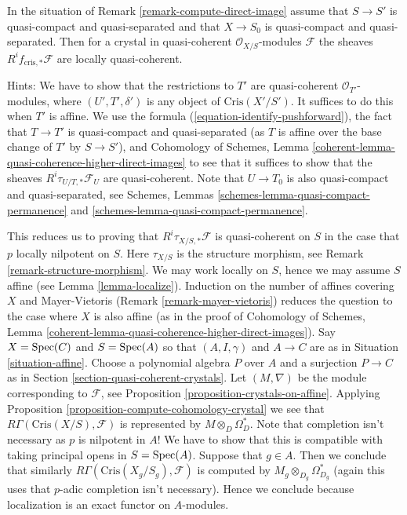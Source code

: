 \begin{remark}
\label{remark-quasi-coherent}
In the situation of Remark \ref{remark-compute-direct-image}
assume that $S \to S'$ is quasi-compact and quasi-separated and
that $X \to S_0$ is quasi-compact and quasi-separated. Then for a crystal
in quasi-coherent $\mathcal{O}_{X/S}$-modules $\mathcal{F}$
the sheaves $R^if_{\text{cris}, *}\mathcal{F}$ are locally quasi-coherent.

\medskip\noindent
Hints: We have to show that the restrictions to $T'$ are quasi-coherent
$\mathcal{O}_{T'}$-modules, where $(U', T', \delta')$ is any object of
$\text{Cris}(X'/S')$. It suffices to do this when $T'$ is affine.
We use the formula (\ref{equation-identify-pushforward}),
the fact that $T \to T'$ is quasi-compact and quasi-separated (as $T$
is affine over the base change of $T'$ by $S \to S'$), and
Cohomology of Schemes, Lemma
\ref{coherent-lemma-quasi-coherence-higher-direct-images}
to see that it suffices to show that the sheaves
$R^i\tau_{U/T, *}\mathcal{F}_U$ are quasi-coherent.
Note that $U \to T_0$ is also quasi-compact and quasi-separated, see
Schemes, Lemmas \ref{schemes-lemma-quasi-compact-permanence} and
\ref{schemes-lemma-quasi-compact-permanence}.

\medskip\noindent
This reduces us to proving that $R^i\tau_{X/S, *}\mathcal{F}$
is quasi-coherent on $S$ in the case that $p$ locally nilpotent on $S$. Here
$\tau_{X/S}$ is the structure morphism, see
Remark \ref{remark-structure-morphism}.
We may work locally on $S$, hence we may assume $S$ affine
(see Lemma \ref{lemma-localize}). Induction on the number
of affines covering $X$ and Mayer-Vietoris
(Remark \ref{remark-mayer-vietoris}) reduces the question to
the case where $X$ is also affine (as in the proof of
Cohomology of Schemes, Lemma
\ref{coherent-lemma-quasi-coherence-higher-direct-images}).
Say $X = \mathop{\mathrm{Spec}}(C)$ and $S = \mathop{\mathrm{Spec}}(A)$ so that $(A, I, \gamma)$ and
$A \to C$ are as
in Situation \ref{situation-affine}. Choose a polynomial algebra
$P$ over $A$ and a surjection $P \to C$ as in
Section \ref{section-quasi-coherent-crystals}.
Let $(M, \nabla)$ be the module corresponding to $\mathcal{F}$, see
Proposition \ref{proposition-crystals-on-affine}.
Applying 
Proposition \ref{proposition-compute-cohomology-crystal}
we see that $R\Gamma(\text{Cris}(X/S), \mathcal{F})$ is represented by
$M \otimes_D \Omega_D^*$. Note that completion isn't necessary
as $p$ is nilpotent in $A$! We have to show that this is compatible
with taking principal opens in $S = \mathop{\mathrm{Spec}}(A)$. Suppose that $g \in A$.
Then we conclude that similarly $R\Gamma(\text{Cris}(X_g/S_g), \mathcal{F})$
is computed by $M_g \otimes_{D_g} \Omega_{D_g}^*$ (again this uses that
$p$-adic completion isn't necessary). Hence we conclude because localization
is an exact functor on $A$-modules.
\end{remark}


